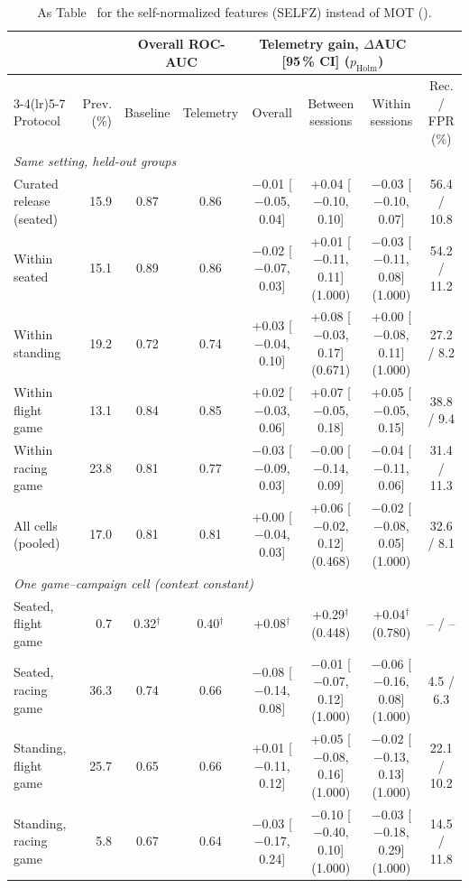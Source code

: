 \begin{table}[t]
\centering
\footnotesize
\caption{As Table~ for the self-normalized features (SELFZ) instead of MOT (\sevtwo{}).}
\label{tab:supp_gain_z}
\setlength{\tabcolsep}{1.5pt}
\begin{tabular}{@{}lrcccccc@{}}
\toprule
 & & \multicolumn{2}{c}{Overall ROC-AUC} & \multicolumn{3}{c}{Telemetry gain, $\Delta$AUC [95\,\% CI] ($p_{\mathrm{Holm}}$)} & \\
\cmidrule(lr){3-4}\cmidrule(lr){5-7}
Protocol & Prev. (\%) & Baseline & Telemetry & Overall & Between sessions & Within sessions & Rec. / FPR (\%) \\
\midrule
\multicolumn{8}{l}{\emph{Same setting, held-out groups}} \\
Curated release (seated) & 15.9 & 0.87 & 0.86 & $-$0.01 [$-$0.05, 0.04] & +0.04 [$-$0.10, 0.10] & $-$0.03 [$-$0.10, 0.07] & 56.4 / 10.8 \\
Within seated & 15.1 & 0.89 & 0.86 & $-$0.02 [$-$0.07, 0.03] & +0.01 [$-$0.11, 0.11] (1.000) & $-$0.03 [$-$0.11, 0.08] (1.000) & 54.2 / 11.2 \\
Within standing & 19.2 & 0.72 & 0.74 & +0.03 [$-$0.04, 0.10] & +0.08 [$-$0.03, 0.17] (0.671) & +0.00 [$-$0.08, 0.11] (1.000) & 27.2 / 8.2 \\
Within flight game & 13.1 & 0.84 & 0.85 & +0.02 [$-$0.03, 0.06] & +0.07 [$-$0.05, 0.18] & +0.05 [$-$0.05, 0.15] & 38.8 / 9.4 \\
Within racing game & 23.8 & 0.81 & 0.77 & $-$0.03 [$-$0.09, 0.03] & $-$0.00 [$-$0.14, 0.09] & $-$0.04 [$-$0.11, 0.06] & 31.4 / 11.3 \\
All cells (pooled) & 17.0 & 0.81 & 0.81 & +0.00 [$-$0.04, 0.03] & +0.06 [$-$0.02, 0.12] (0.468) & $-$0.02 [$-$0.08, 0.05] (1.000) & 32.6 / 8.1 \\
\multicolumn{8}{l}{\emph{One game--campaign cell (context constant)}} \\
Seated, flight game & 0.7 & 0.32$^\dagger$ & 0.40$^\dagger$ & +0.08$^\dagger$ & +0.29$^\dagger$ (0.448) & +0.04$^\dagger$ (0.780) & -- / -- \\
Seated, racing game & 36.3 & 0.74 & 0.66 & $-$0.08 [$-$0.14, 0.08] & $-$0.01 [$-$0.07, 0.12] (1.000) & $-$0.06 [$-$0.16, 0.08] (1.000) & 4.5 / 6.3 \\
Standing, flight game & 25.7 & 0.65 & 0.66 & +0.01 [$-$0.11, 0.12] & +0.05 [$-$0.08, 0.16] (1.000) & $-$0.02 [$-$0.13, 0.13] (1.000) & 22.1 / 10.2 \\
Standing, racing game & 5.8 & 0.67 & 0.64 & $-$0.03 [$-$0.17, 0.24] & $-$0.10 [$-$0.40, 0.10] (1.000) & $-$0.03 [$-$0.18, 0.29] (1.000) & 14.5 / 11.8 \\

\end{tabular}
\end{table}
